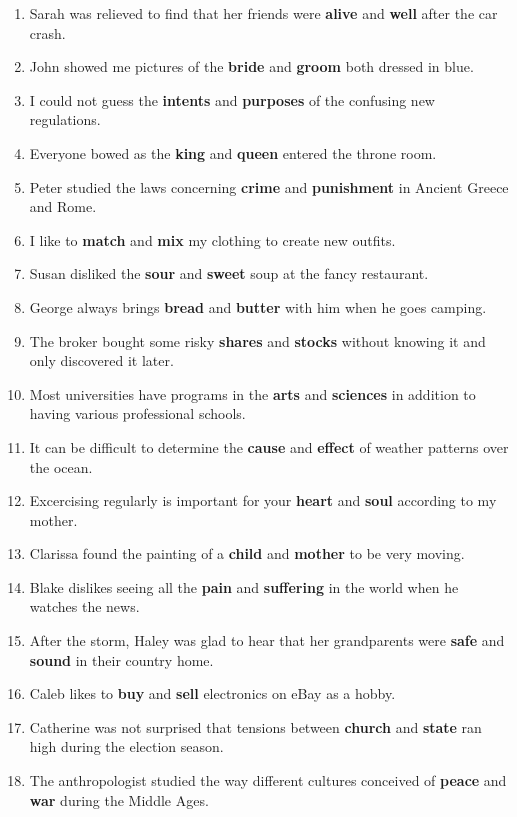 \documentclass[authoryear]{elsarticle}
\begin{document}
\begin{enumerate}

\item Sarah was relieved to find that her friends were \textbf{alive} and \textbf{well} after the car crash.
\item John showed me pictures of the \textbf{bride} and \textbf{groom} both dressed in blue.
\item I could not guess the \textbf{intents} and \textbf{purposes} of the confusing new regulations.
\item Everyone bowed as the \textbf{king} and \textbf{queen} entered the throne room.
\item Peter studied the laws concerning \textbf{crime} and \textbf{punishment} in Ancient Greece and Rome.
\item I like to \textbf{match} and \textbf{mix} my clothing to create new outfits.
\item Susan disliked the \textbf{sour} and \textbf{sweet} soup at the fancy restaurant.
\item George always brings \textbf{bread} and \textbf{butter} with him when he goes camping.
\item The broker bought some risky \textbf{shares} and \textbf{stocks} without knowing it and only discovered it later.
\item Most universities have programs in the \textbf{arts} and \textbf{sciences} in addition to having various professional schools.
\item It can be difficult to determine the \textbf{cause} and \textbf{effect} of weather patterns over the ocean.
\item Excercising regularly is important for your \textbf{heart} and \textbf{soul} according to my mother.
\item Clarissa found the painting of a \textbf{child} and \textbf{mother} to be very moving.
\item Blake dislikes seeing all the \textbf{pain} and \textbf{suffering} in the world when he watches the news.
\item After the storm, Haley was glad to hear that her grandparents were \textbf{safe} and \textbf{sound} in their country home.
\item Caleb likes to \textbf{buy} and \textbf{sell} electronics on eBay as a hobby.
\item Catherine was not surprised that tensions between \textbf{church} and \textbf{state} ran high during the election season.
\item The anthropologist studied the way different cultures conceived of \textbf{peace} and \textbf{war} during the Middle Ages.

\end{enumerate}
\end{document}
